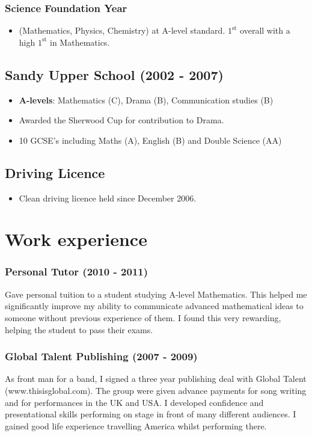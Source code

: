 \documentclass[11pt]{article}
\begin{document}
\subsubsection*{Science Foundation Year}
\begin{itemize}
\item (Mathematics, Physics, Chemistry) at A-level standard. \(1^{\text{st}}\) overall with a high \(1^{\text{st}}\) in Mathematics.
\end{itemize}
\subsection*{Sandy Upper School (2002 - 2007)}
\begin{itemize}
\item \textbf{A-levels}: Mathematics (C), Drama (B), Communication studies (B)
\item Awarded the Sherwood Cup for contribution to Drama.
\item 10 GCSE's including Maths (A), English (B) and Double Science (AA) 
\end{itemize}
\subsection*{Driving Licence}
\begin{itemize}
\item Clean driving licence held since December 2006.
\end{itemize}

\section*{Work experience}
\subsubsection*{Personal Tutor (2010 - 2011)}
Gave personal tuition to a student studying A-level Mathematics. This helped me significantly improve my ability to communicate advanced mathematical ideas to someone without previous experience of them. I found this very rewarding, helping the student to pass their exams.    
\subsubsection*{Global Talent Publishing (2007 - 2009)}
As front man for a band, I signed a three year publishing deal with Global Talent (www.thisisglobal.com). The group were given advance payments for song writing and for performances in the UK and USA. I developed confidence and presentational skills performing on stage in front of many different audiences. I gained good life experience travelling America whilst performing there.
\end{document}
